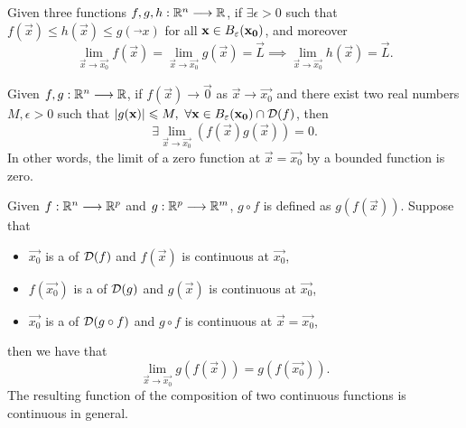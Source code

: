 \begin{lemma}
    Given three functions $\appl{f, g, h}{\Rtn}{\R}$, if $\exists\epsilon > 0$ such that $f(\vec{x})\leq h(\vec{x})\leq 
    g(\vec{}x)$ for all $\vec{x}\in\oball{\epsilon}{\vec{x_0}}$, and moreover 
    \begin{equation}
        \lim_{\vec{x}\to\vec{x_0}}f(\vec{x}) = \lim_{\vec{x}\to\vec{x_0}}g(\vec{x}) = \vec{L}\implies
        \lim_{\vec{x}\to\vec{x_0}}h(\vec{x}) = \vec{L}. 
    \end{equation}
\end{lemma}

\begin{prop}
    Given $\appl{f, g}{\Rtn}{\R}$, if $f(\vec{x})\longrightarrow\vec{0}$ as $\vec{x}\longrightarrow\vec{x_0}$ and there
    exist two real numbers $M, \epsilon > 0$ such that $\abs{g(\vec{x})}\leq M,\ \forall\vec{x}\in
    \oball{\epsilon}{\vec{x_0}}\cap\dom{f}$, then
    \begin{equation}
        \exists\lim_{\vec{x}\to\vec{x_0}}\left(f(\vec{x})g(\vec{x})\right) = 0.
    \end{equation}
    In other words, the limit of a zero function at $\vec{x} = \vec{x_0}$ by a bounded function is zero.
\end{prop}

\begin{prop}
    Given $\appl{f}{\Rtn}{\R^p}$ and $\appl{g}{\R^p}{\R^m}$, $g\circ f$ is defined as $g\left(f(\vec{x})\right)$. Suppose
    that
    \begin{itemize}[itemsep = -2pt, topsep = -2pt]
        \item $\vec{x_0}$ is a  of $\dom{f}$ and $f(\vec{x})$ is continuous at $\vec{x_0}$,
        \item $f(\vec{x_0})$ is a  of $\dom{g}$ and $g(\vec{x})$ is continuous at $\vec{x_0}$,
        \item $\vec{x_0}$ is a  of $\dom{g\circ f}$ and $g\circ f$ is continuous at $\vec{x} = \vec{x_0}$,
    \end{itemize}
    then we have that
    \begin{equation}
        \lim_{\vec{x}\to\vec{x_0}}g\left(f(\vec{x})\right) = g\left(f(\vec{x_0})\right).
    \end{equation}
    The resulting function of the composition of two continuous functions is continuous in general.
\end{prop}


